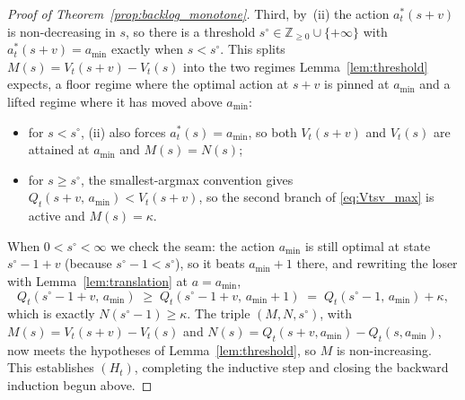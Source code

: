 \documentclass[preprint,11pt,authoryear]{elsarticle}
\newcommand{\bvec}[1]{\mathbf{#1}}
\theoremstyle{remark}
\begin{document}
\begin{proof}[Proof of Theorem~\ref{prop:backlog_monotone}]
Third, by~(ii) the action $a^*_t(s+v)$ is non-decreasing in $s$, so there is a threshold $s^\circ \in \mathbb{Z}_{\ge 0} \cup \{+\infty\}$ with $a^*_t(s+v) = a_{\min}$ exactly when $s < s^\circ$. This splits $M(s) = V_t(s+v) - V_t(s)$ into the two regimes Lemma~\ref{lem:threshold} expects, a floor regime where the optimal action at $s+v$ is pinned at $a_{\min}$ and a lifted regime where it has moved above $a_{\min}$:
\begin{itemize}
\item for $s < s^\circ$, (ii) also forces $a^*_t(s) = a_{\min}$, so both $V_t(s+v)$ and $V_t(s)$ are attained at $a_{\min}$ and $M(s) = N(s)$;
\item for $s \ge s^\circ$, the smallest-argmax convention gives $Q_t(s+v,\, a_{\min}) < V_t(s+v)$, so the second branch of \eqref{eq:Vtsv_max} is active and $M(s) = \kappa$.
\end{itemize}
When $0 < s^\circ < \infty$ we check the seam: the action $a_{\min}$ is still optimal at state $s^\circ - 1 + v$ (because $s^\circ - 1 < s^\circ$), so it beats $a_{\min}+1$ there, and rewriting the loser with Lemma~\ref{lem:translation} at $a = a_{\min}$,
\[
Q_t(s^\circ - 1 + v,\, a_{\min}) \;\ge\; Q_t(s^\circ - 1 + v,\, a_{\min}+1) \;=\; Q_t(s^\circ - 1,\, a_{\min}) + \kappa,
\]
which is exactly $N(s^\circ - 1) \ge \kappa$. The triple $(M, N, s^\circ)$, with $M(s) = V_t(s+v) - V_t(s)$ and $N(s) = Q_t(s+v, a_{\min}) - Q_t(s, a_{\min})$, now meets the hypotheses of Lemma~\ref{lem:threshold}, so $M$ is non-increasing. This establishes $(H_t)$, completing the inductive step and closing the backward induction begun above.
\end{proof}

\end{document}
